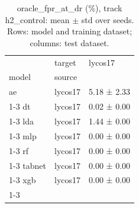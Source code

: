 \begin{table}
\caption{oracle_fpr_at_dr (\%), track h2_control: mean $\pm$ std over seeds. Rows: model and training dataset; columns: test dataset.}
\label{tab:matrix_h2_control_oracle_fpr_at_dr}
\begin{tabular}{lll}
\toprule
 & target & lycos17 \\
model & source &  \\
\midrule
ae & lycos17 & 5.18 ± 2.33 \\
\cline{1-3}
dt & lycos17 & 0.02 ± 0.00 \\
\cline{1-3}
lda & lycos17 & 1.44 ± 0.00 \\
\cline{1-3}
mlp & lycos17 & 0.00 ± 0.00 \\
\cline{1-3}
rf & lycos17 & 0.00 ± 0.00 \\
\cline{1-3}
tabnet & lycos17 & 0.00 ± 0.00 \\
\cline{1-3}
xgb & lycos17 & 0.00 ± 0.00 \\
\cline{1-3}
\bottomrule
\end{tabular}
\end{table}
